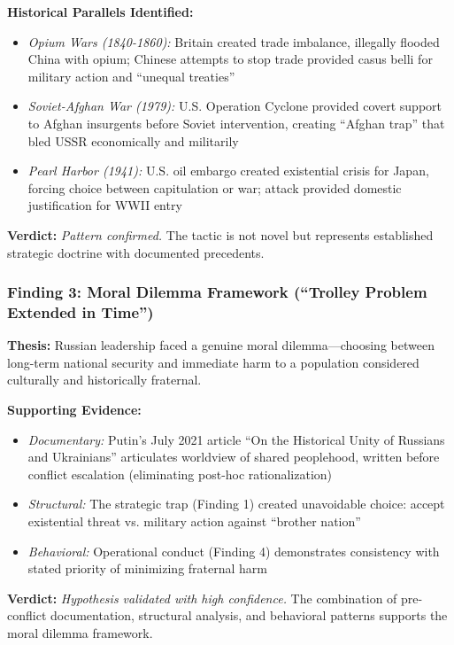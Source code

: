 \documentclass[11pt,a4paper]{article}
\begin{document}
\begin{small}
\textbf{Historical Parallels Identified:}
\begin{itemize}[nosep]
    \item \textit{Opium Wars (1840-1860):} Britain created trade imbalance, illegally flooded China with opium; Chinese attempts to stop trade provided casus belli for military action and ``unequal treaties''
    \item \textit{Soviet-Afghan War (1979):} U.S. Operation Cyclone provided covert support to Afghan insurgents before Soviet intervention, creating ``Afghan trap'' that bled USSR economically and militarily
    \item \textit{Pearl Harbor (1941):} U.S. oil embargo created existential crisis for Japan, forcing choice between capitulation or war; attack provided domestic justification for WWII entry
\end{itemize}

\textbf{Verdict:} \textit{Pattern confirmed.} The tactic is not novel but represents established strategic doctrine with documented precedents.

\subsubsection{Finding 3: Moral Dilemma Framework (``Trolley Problem Extended in Time'')}

\textbf{Thesis:} Russian leadership faced a genuine moral dilemma---choosing between long-term national security and immediate harm to a population considered culturally and historically fraternal.

\textbf{Supporting Evidence:}
\begin{itemize}[nosep]
    \item \textit{Documentary:} Putin's July 2021 article ``On the Historical Unity of Russians and Ukrainians'' articulates worldview of shared peoplehood, written before conflict escalation (eliminating post-hoc rationalization)
    \item \textit{Structural:} The strategic trap (Finding 1) created unavoidable choice: accept existential threat vs. military action against ``brother nation''
    \item \textit{Behavioral:} Operational conduct (Finding 4) demonstrates consistency with stated priority of minimizing fraternal harm
\end{itemize}

\textbf{Verdict:} \textit{Hypothesis validated with high confidence.} The combination of pre-conflict documentation, structural analysis, and behavioral patterns supports the moral dilemma framework.


\end{small}
\end{document}
